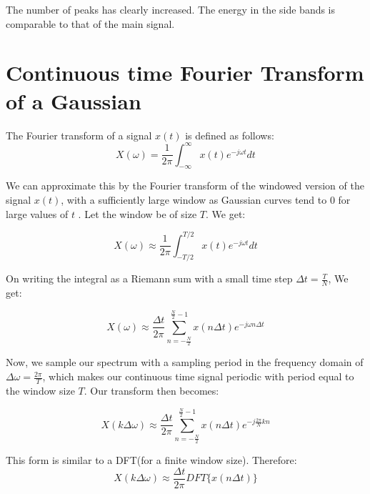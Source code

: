 \documentclass{article}
\begin{document}
The number of peaks has clearly increased. The energy in the side bands is comparable to that of the main signal.



\section*{Continuous time Fourier Transform of a Gaussian}
		
The Fourier transform of a signal $x(t)$ is defined as follows:\newline
\begin{equation}
X(\omega) = \frac{1}{2 \pi} \int_{- \infty}^{\infty} x(t) e^{-j \omega t} dt    
\end{equation}

\noindent
We can approximate this by the Fourier transform of the windowed version
of the signal $x(t)$, with a sufficiently large window as Gaussian curves tend to $0$ for large values of $t$ . Let the window be of size $T$. We get:

\begin{equation}
  X(\omega) \approx \frac{1}{2 \pi} \int_{- T/2}^{T/2} x(t) e^{-j \omega t} dt  
\end{equation}

\noindent
On writing the integral as a Riemann sum with a small time step $\Delta t = \frac{T}{N}$, We get:

\begin{equation}
    X(\omega) \approx \frac{\Delta t}{2 \pi} \sum_{n = -\frac{N}{2}}^{\frac{N}{2}-1} x(n \Delta t) e^{-j \omega n \Delta t}
\end{equation}

\noindent
Now, we sample our spectrum with a sampling period in the frequency
domain of \(\Delta \omega = \frac{2 \pi}{T}\), which makes our
continuous time signal periodic with period equal to the window size
\(T\). Our transform then becomes:

\begin{equation}
X(k \Delta \omega) \approx \frac{\Delta t}{2 \pi} \sum_{n = -\frac{N}{2}}^{\frac{N}{2}-1}x(n \Delta t) e^{-j \frac{2 \pi}{N} k n} 
\end{equation}

\noindent
This form is similar to a DFT(for a finite window size). Therefore:
\begin{equation}
X(k \Delta \omega) \approx \frac{\Delta t}{2 \pi} DFT \{x(n \Delta t)\}    
\end{equation}
\end{document}
